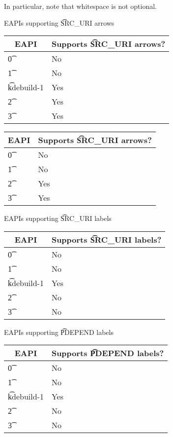 In particular, note that whitespace is not optional.

\begin{centertable}{EAPIs supporting \t{SRC\_URI} arrows} \label{tab:uri-arrows-table}
\IFKDEBUILDELSE
{
    \begin{tabular}{ l l }
        \toprule
        \multicolumn{1}{c}{\textbf{EAPI}} &
        \multicolumn{1}{c}{\textbf{Supports \t{SRC\_URI} arrows?}} \\
        \midrule
    \t{0} & No \\
    \t{1} & No \\
    \t{kdebuild-1} & Yes \\
    \t{2} & Yes \\
    \t{3} & Yes \\
    \bottomrule
    \end{tabular}
}{
    \begin{tabular}{ l l }
        \toprule
        \multicolumn{1}{c}{\textbf{EAPI}} &
        \multicolumn{1}{c}{\textbf{Supports \t{SRC\_URI} arrows?}} \\
        \midrule
    \t{0} & No \\
    \t{1} & No \\
    \t{2} & Yes \\
    \t{3} & Yes \\
    \bottomrule
    \end{tabular}
}
\end{centertable}

\IFKDEBUILDELSE
{
    \begin{centertable}{EAPIs supporting \t{SRC\_URI} labels} \label{tab:uri-labels-table}
    \begin{tabular}{ l l }
        \toprule
        \multicolumn{1}{c}{\textbf{EAPI}} &
        \multicolumn{1}{c}{\textbf{Supports \t{SRC\_URI} labels?}} \\
        \midrule
    \t{0} & No \\
    \t{1} & No \\
    \t{kdebuild-1} & Yes \\
    \t{2} & No \\
    \t{3} & No \\
    \bottomrule
    \end{tabular}
    \end{centertable}

    \begin{centertable}{EAPIs supporting \t{PDEPEND} labels} \label{tab:pdepend-labels-table}
    \begin{tabular}{ l l }
        \toprule
        \multicolumn{1}{c}{\textbf{EAPI}} &
        \multicolumn{1}{c}{\textbf{Supports \t{PDEPEND} labels?}} \\
        \midrule
    \t{0} & No \\
    \t{1} & No \\
    \t{kdebuild-1} & Yes \\
    \t{2} & No \\
    \t{3} & No \\
    \bottomrule
    \end{tabular}
    \end{centertable}
}{
}

